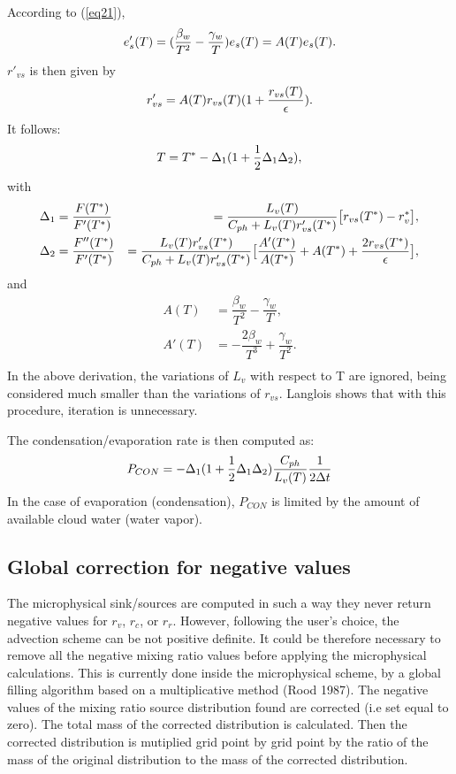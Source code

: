 According to (\ref{eq21}),
\begin{equation}
e_s'(T)= ( {\beta_w \over T^2} - {\gamma_w \over T}) e_s(T) = A(T) e_s(T).
\end{equation}
$r'_{vs}$ is then given by
\begin{equation}
r'_{vs} = A(T) r_{vs}(T)(1 + {r_{vs}(T) \over \epsilon}).
\end{equation}
It follows:
\begin{equation}
T= T^* - \Delta_1 (1 +{1\over 2} \Delta_1 \Delta_2),
\end{equation}
with
\begin{eqnarray}
\Delta_1&= \dfrac {F(T^*)}{ F'(T^*)}&= {L_v(T) \over C_{ph} + L_v(T)r'_{vs}(T^*)}
         \big[r_{vs}(T^*)-r_v^*\big], \\
\Delta_2&= \dfrac {F''(T^*)}{F'(T^*)}&= {L_v(T) r'_{vs}(T^*) \over C_{ph} + L_v(T) r'_{vs}(T^*)}
         \big[ {A'(T^*) \over A(T^*)} + A(T^*) +
{2 r_{vs}(T^*) \over \epsilon}\big] ,
\end{eqnarray}
and
\begin{eqnarray}
A(T)&=\dfrac{\beta_w}{T^2} - \dfrac{\gamma_w}{T}, \\
A'(T)&=-\dfrac{2\beta_w}{T^3} + \dfrac{\gamma_w}{T^2}. \\
\end{eqnarray}
In the above derivation, the variations of $L_v$ with respect to T are ignored,
being considered much smaller than the variations of $r_{vs}$. Langlois shows
that with this procedure, iteration is unnecessary.

The condensation/evaporation rate is then computed as:
\begin{equation}
P_{CON}= - \Delta_1 (1 +{1\over 2} \Delta_1 \Delta_2){C_{ph}\over L_v(T)}
{1 \over 2\Delta t}
\end{equation}
In the case of evaporation (condensation), $P_{CON}$ is limited by the amount
of available cloud water (water vapor).

\subsection{Global correction for negative values}
The microphysical sink/sources are computed in such a way they never return
negative values for $r_v$, $r_c$, or $r_r$.
However, following the user's choice, the advection
scheme can be not positive definite. It could be therefore necessary to remove all the
negative mixing ratio values before applying the microphysical calculations.
This is currently done inside the microphysical scheme,
by a global filling algorithm based on a multiplicative method
(Rood 1987). The
negative values of the mixing ratio source distribution found are
corrected (i.e set equal to zero). The total mass of the corrected distribution
is calculated. Then the corrected distribution is mutiplied grid point by
grid point by the ratio of the mass of the original distribution to the mass of
the corrected distribution.

